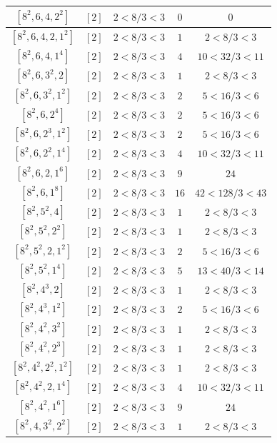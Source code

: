 \documentclass{article}%
\begin{document}
\begin{center}
\begin{longtable}{||c|c|c|c|c||}
$[8^{2}, 6, 4, 2^{2}]$ & $[2]$ & $2 < 8/3 < 3$ & $0$ & $0$ \\ \hline 
$[8^{2}, 6, 4, 2, 1^{2}]$ & $[2]$ & $2 < 8/3 < 3$ & $1$ & $2 < 8/3 < 3$ \\ \hline 
$[8^{2}, 6, 4, 1^{4}]$ & $[2]$ & $2 < 8/3 < 3$ & $4$ & $10 < 32/3 < 11$ \\ \hline 
$[8^{2}, 6, 3^{2}, 2]$ & $[2]$ & $2 < 8/3 < 3$ & $1$ & $2 < 8/3 < 3$ \\ \hline 
$[8^{2}, 6, 3^{2}, 1^{2}]$ & $[2]$ & $2 < 8/3 < 3$ & $2$ & $5 < 16/3 < 6$ \\ \hline 
$[8^{2}, 6, 2^{4}]$ & $[2]$ & $2 < 8/3 < 3$ & $2$ & $5 < 16/3 < 6$ \\ \hline 
$[8^{2}, 6, 2^{3}, 1^{2}]$ & $[2]$ & $2 < 8/3 < 3$ & $2$ & $5 < 16/3 < 6$ \\ \hline 
$[8^{2}, 6, 2^{2}, 1^{4}]$ & $[2]$ & $2 < 8/3 < 3$ & $4$ & $10 < 32/3 < 11$ \\ \hline 
$[8^{2}, 6, 2, 1^{6}]$ & $[2]$ & $2 < 8/3 < 3$ & $9$ & $24$ \\ \hline 
$[8^{2}, 6, 1^{8}]$ & $[2]$ & $2 < 8/3 < 3$ & $16$ & $42 < 128/3 < 43$ \\ \hline 
$[8^{2}, 5^{2}, 4]$ & $[2]$ & $2 < 8/3 < 3$ & $1$ & $2 < 8/3 < 3$ \\ \hline 
$[8^{2}, 5^{2}, 2^{2}]$ & $[2]$ & $2 < 8/3 < 3$ & $1$ & $2 < 8/3 < 3$ \\ \hline 
$[8^{2}, 5^{2}, 2, 1^{2}]$ & $[2]$ & $2 < 8/3 < 3$ & $2$ & $5 < 16/3 < 6$ \\ \hline 
$[8^{2}, 5^{2}, 1^{4}]$ & $[2]$ & $2 < 8/3 < 3$ & $5$ & $13 < 40/3 < 14$ \\ \hline 
$[8^{2}, 4^{3}, 2]$ & $[2]$ & $2 < 8/3 < 3$ & $1$ & $2 < 8/3 < 3$ \\ \hline 
$[8^{2}, 4^{3}, 1^{2}]$ & $[2]$ & $2 < 8/3 < 3$ & $2$ & $5 < 16/3 < 6$ \\ \hline 
$[8^{2}, 4^{2}, 3^{2}]$ & $[2]$ & $2 < 8/3 < 3$ & $1$ & $2 < 8/3 < 3$ \\ \hline 
$[8^{2}, 4^{2}, 2^{3}]$ & $[2]$ & $2 < 8/3 < 3$ & $1$ & $2 < 8/3 < 3$ \\ \hline 
$[8^{2}, 4^{2}, 2^{2}, 1^{2}]$ & $[2]$ & $2 < 8/3 < 3$ & $1$ & $2 < 8/3 < 3$ \\ \hline 
$[8^{2}, 4^{2}, 2, 1^{4}]$ & $[2]$ & $2 < 8/3 < 3$ & $4$ & $10 < 32/3 < 11$ \\ \hline 
$[8^{2}, 4^{2}, 1^{6}]$ & $[2]$ & $2 < 8/3 < 3$ & $9$ & $24$ \\ \hline 
$[8^{2}, 4, 3^{2}, 2^{2}]$ & $[2]$ & $2 < 8/3 < 3$ & $1$ & $2 < 8/3 < 3$ \\ \hline 

\end{longtable}
\end{center}
\end{document}
